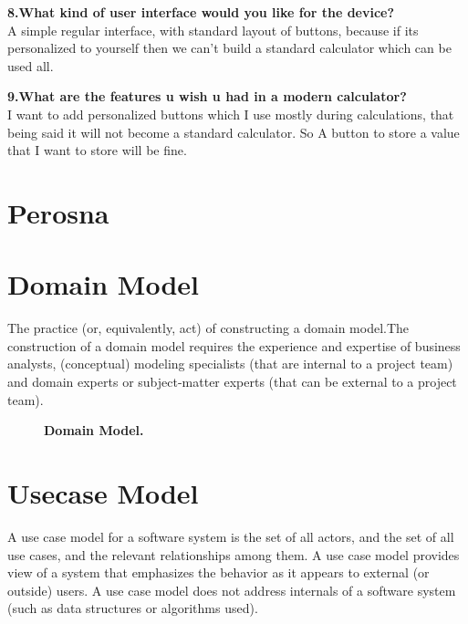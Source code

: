 \documentclass[12pt]{article}
\begin{document}
\begin{justify}
\noindent \textbf{8.What kind of user interface would you like for the device?}\\
A simple regular interface, with standard layout of buttons, because if its personalized to yourself then we can’t build a standard calculator which can be used all.

\noindent \textbf{9.What are the features u wish u had in a modern calculator?}\\
I want to add personalized buttons which I use mostly during calculations, that being said  it will not become a standard calculator. So A button to store a value that I want to store will be fine.
\end{justify}
\newpage

\section{Perosna}
\begin{figure}[!htbp]
  \centering
\end{figure}
\newpage

\section{\centering Domain Model}

The practice (or, equivalently, act) of constructing a domain model.The construction of a domain model requires the experience and expertise of business analysts, (conceptual) modeling specialists (that are internal to a project team) and domain experts or subject-matter experts (that can be external to a project team).
\vspace{7\baselineskip}
\begin{figure}[!htbp]
  \centering
  \caption{\textbf{Domain Model.} }
\end{figure}
\newpage
  
\section{\centering Usecase Model}

A use case model for a software system is the set of all actors, and the set of all use cases, and the relevant relationships among them. A use case model provides view of a system that emphasizes the behavior as it appears to external (or outside) users. A use case model does not address internals of a software system (such as data structures or algorithms used).
\vspace{7\baselineskip}
\end{document}
